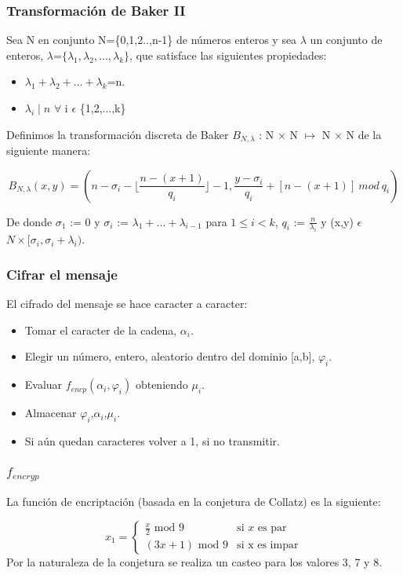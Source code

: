 \documentclass[dvipdfm]{beamer}
\begin{document}
\begin{frame}
\frametitle{ Transformaci\'on de Baker II}
  Sea N en conjunto N=\{0,1,2..,n-1\} de n\'umeros enteros y sea $\lambda$ un conjunto de enteros, $\lambda$=$\{\lambda_{1}, \lambda_{2},...,\lambda_{k}\}$, que satisface las siguientes propiedades:

\begin{itemize}
	\item $\lambda_{1}+\lambda_{2}+...+\lambda_{k}$=n.
	\item $\lambda_{i}\mid n$ $\forall$ i $\epsilon$ \{1,2,...,k\}
\end{itemize}

Definimos la transformaci\'on discreta de Baker $B_{N,\lambda}$ : N $\times$ N $\longmapsto$ N $\times$ N de la siguiente manera:

\begin{equation}
  B_{N,\lambda}(x,y) = ( n - \sigma_{i} - \lfloor\frac{n-(x+1)}{q_{i}}\rfloor -1 , \frac{y-\sigma_{i}}{q_{i}} + [n-(x+1)] \ mod \ q_{i} ) 
\end{equation}

De donde $\sigma_{1}$ := 0 y $\sigma_{i}$ := $\lambda_{1}+...+\lambda_{i-1}$ para $1 \leq i < k$, $q_{i}$ := $\frac{n}{\lambda_{i}}$ y (x,y) $\epsilon$ $ N \times [\sigma_{i},\sigma_{i}+\lambda_{i})$.

\end{frame}

\begin{frame}
 \frametitle{Cifrar el mensaje}
 El cifrado del mensaje se hace caracter a caracter:
 \begin{itemize}
 \item Tomar el caracter de la cadena, $\alpha_{i}$.
 \item Elegir un n\'umero, entero, aleatorio dentro del dominio [a,b], $\varphi_{i}$.
 \item Evaluar $f_{encp}(\alpha_{i},\varphi_{i})$ obteniendo $\mu_{i}$.
 \item Almacenar $\varphi_{i}$,$\alpha_{i}$,$\mu_{i}$.
 \item Si a\'un quedan caracteres volver a 1, si no transmitir.

 \end{itemize}

\end{frame}

\begin{frame}
 \frametitle{$f_{encryp}$}
 La funci\'on de encriptaci\'on (basada en la conjetura de Collatz) es la siguiente:
 
 \[ x_{1} = 
\begin{cases} 
	\frac{x}{2} \text { mod  9} & \text {si } x \text { es par} \\ 
	(3x+1) \text { mod 9} & \text {si  x} \text { es impar} 
\end{cases} 
\] 
Por la naturaleza de la conjetura se realiza un casteo para los valores 3, 7 y 8.
 
\end{frame}
\end{document}
